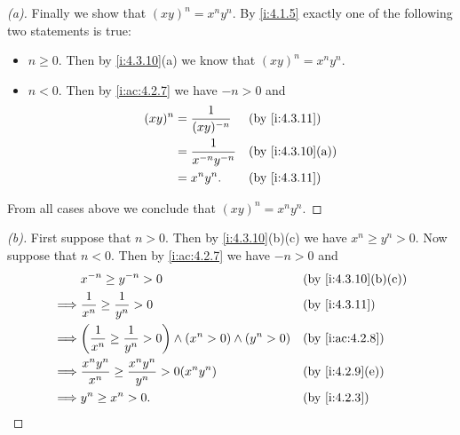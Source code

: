 \begin{proof}[(a)]
  Finally we show that \((xy)^n = x^n y^n\).
  By \cref{i:4.1.5} exactly one of the following two statements is true:
  \begin{itemize}
    \item \(n \geq 0\).
          Then by \cref{i:4.3.10}(a) we know that \((xy)^n = x^n y^n\).
    \item \(n < 0\).
          Then by \cref{i:ac:4.2.7} we have \(-n > 0\) and
          \begin{align*}
            (xy)^n & = \dfrac{1}{(xy)^{-n}}     &  & \by{i:4.3.11}    \\
                   & = \dfrac{1}{x^{-n} y^{-n}} &  & \by{i:4.3.10}[a] \\
                   & = x^n y^n.                 &  & \by{i:4.3.11}
          \end{align*}
  \end{itemize}
  From all cases above we conclude that \((xy)^n = x^n y^n\).
\end{proof}

\begin{proof}[(b)]
  First suppose that \(n > 0\).
  Then by \cref{i:4.3.10}(b)(c) we have \(x^n \geq y^n > 0\).
  Now suppose that \(n < 0\).
  Then by \cref{i:ac:4.2.7} we have \(-n > 0\) and
  \begin{align*}
             & x^{-n} \geq y^{-n} > 0                                                      &  & \by{i:4.3.10}[b,c] \\
    \implies & \dfrac{1}{x^n} \geq \dfrac{1}{y^n} > 0                                      &  & \by{i:4.3.11}      \\
    \implies & \pa{\dfrac{1}{x^n} \geq \dfrac{1}{y^n} > 0} \land (x^n > 0) \land (y^n > 0) &  & \by{i:ac:4.2.8}    \\
    \implies & \dfrac{x^n y^n}{x^n} \geq \dfrac{x^n y^n}{y^n} > 0(x^n y^n)                 &  & \by{i:4.2.9}[e]    \\
    \implies & y^n \geq x^n > 0.                                                           &  & \by{i:4.2.3}
  \end{align*}
\end{proof}


